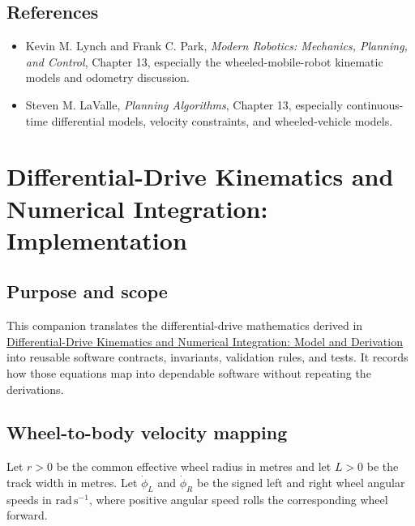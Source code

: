 \documentclass[
  australian,
  12pt,
  letterpaper,
  DIV=11,
  numbers=noendperiod,
  twoside]{scrreprt}
\providecommand{\tightlist}{%
  \setlength{\itemsep}{0pt}\setlength{\parskip}{0pt}}
\begin{document}
\section*{References}\label{references-2}


\begin{itemize}
\tightlist
\item
  Kevin M. Lynch and Frank C. Park, \emph{Modern Robotics: Mechanics,
  Planning, and Control}, Chapter 13, especially the
  wheeled-mobile-robot kinematic models and odometry discussion.
\item
  Steven M. LaValle, \emph{Planning Algorithms}, Chapter 13, especially
  continuous-time differential models, velocity constraints, and
  wheeled-vehicle models.
\end{itemize}

\chapter{Differential-Drive Kinematics and Numerical Integration:
Implementation}\label{sec-kinematics-integration-implementation}

\section*{Purpose and scope}\label{purpose-and-scope}


This companion translates the differential-drive mathematics derived in
\hyperref[sec-differential-drive-model]{Differential-Drive Kinematics
and Numerical Integration: Model and Derivation} into reusable software
contracts, invariants, validation rules, and tests. It records how those
equations map into dependable software without repeating the
derivations.

\section{Wheel-to-body velocity
mapping}\label{wheel-to-body-velocity-mapping}

Let \(r>0\) be the common effective wheel radius in metres and let
\(L>0\) be the track width in metres. Let \(\dot\phi_L\) and
\(\dot\phi_R\) be the signed left and right wheel angular speeds in
\(\mathrm{rad\,s^{-1}}\), where positive angular speed rolls the
corresponding wheel forward.
\end{document}

